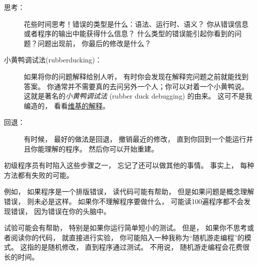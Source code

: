{\begin{description}
\item [思考：]    花些时间思考！错误的类型是什么：语法、运行时、语义？
    你从错误信息或者程序的输出中能获得什么信息？
    什么类型的错误能引起你看到的问题？问题出现前， 你最后的修改是什么？

\item [小黄鸭调试法(rubberducking)：]如果将你的问题解释给别人听， 有时你会发现在解释完问题之前就能找到答案。
    你通常并不需要真的去问另外一个人；你可以对着一个小黄鸭说。
    这就是著名的{\em 小黄鸭调试法} (rubber duck
    debugging) 的由来。   这可不是我编造的， 看看\href{https://en.wikipedia.org/wiki/Rubber_duck_debugging}{维基的解释}。


\item [回退：]有时候， 最好的做法是回退， 撤销最近的修改，
    直到你回到一个能运行并且你能理解的程序。  然后你可以开始重建。

\end{description}



初级程序员有时陷入这些步骤之一， 忘记了还可以做其他的事情。
事实上， 每种方法都有失败的可能。



例如， 如果程序是一个排版错误， 读代码可能有帮助，
但是如果问题是概念理解错误， 则未必是这样。
如果你不理解程序要做什么， 可能读100遍程序都不会发现错误， 因为错误在你的头脑中。



试验可能会有帮助， 特别是如果你运行简单短小的测试。
但是， 如果你不思考或者阅读你的代码， 就直接进行实验，
你可能陷入一种我称为“随机游走编程”的模式。
这指的是随机修改， 直到程序通过测试。
不用说， 随机游走编程会花费很长的时间。

}
